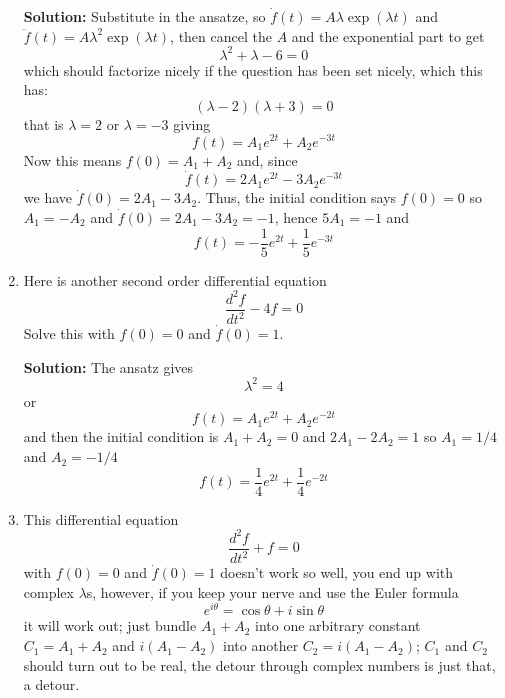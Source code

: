 \documentclass[12pt]{article}
\begin{document}
\begin{enumerate}
\textbf{Solution: } Substitute in the ansatze, so $\dot{f}(t)=A\lambda
\exp(\lambda t)$ and $\ddot{f}(t)=A\lambda^2 \exp(\lambda t)$, then
cancel the $A$ and the exponential part to get
\begin{equation}
\lambda^2+\lambda-6=0
\end{equation}
which should factorize nicely if the question has been set nicely, which this has:
\begin{equation}
(\lambda-2)(\lambda+3)=0
\end{equation}
that is $\lambda=2$ or $\lambda=-3$ giving
\begin{equation}
f(t)=A_1e^{2t}+A_2e^{-3t}
\end{equation}
Now this means $f(0)=A_1+A_2$ and, since
\begin{equation}
\dot{f}(t)=2A_1e^{2t}-3A_2e^{-3t}
\end{equation}
we have $\dot{f}(0)=2A_1-3A_2$. Thus, the initial condition says $f(0)=0$ so $A_1=-A_2$ and $\dot{f}(0)=2A_1-3A_2=-1$, hence $5A_1=-1$ and
\begin{equation}
f(t)=-\frac{1}{5}e^{2t}+\frac{1}{5}e^{-3t}
\end{equation}

\item Here is another second order differential equation
\begin{equation}
\frac{d^2f}{dt^2}-4f=0
\end{equation}
Solve this with $f(0)=0$ and $\dot{f}(0)=1$.

\textbf{Solution: } The ansatz gives
\begin{equation}
\lambda^2=4
\end{equation}
or 
\begin{equation}
f(t)=A_1e^{2t}+A_2e^{-2t}
\end{equation}
and then the initial condition is $A_1+A_2=0$ and $2A_1-2A_2=1$ so $A_1=1/4$ and $A_2=-1/4$
\begin{equation}
f(t)=\frac{1}{4}e^{2t}+\frac{1}{4}e^{-2t}
\end{equation}


\item This differential equation
\begin{equation}
\frac{d^2f}{dt^2}+f=0
\end{equation}
with $f(0)=0$ and $\dot{f}(0)=1$ doesn't work so well, you end up with
complex $\lambda$s, however, if you keep your nerve and use the Euler formula
\begin{equation}
e^{i\theta}=\cos{\theta}+i\sin{\theta}
\end{equation}
it will work out; just bundle $A_1+A_2$ into one arbitrary constant
$C_1=A_1+A_2$ and $i(A_1-A_2)$ into another $C_2=i(A_1-A_2)$; $C_1$
and $C_2$ should turn out to be real, the detour through complex
numbers is just that, a detour.



\end{enumerate}
\end{document}
